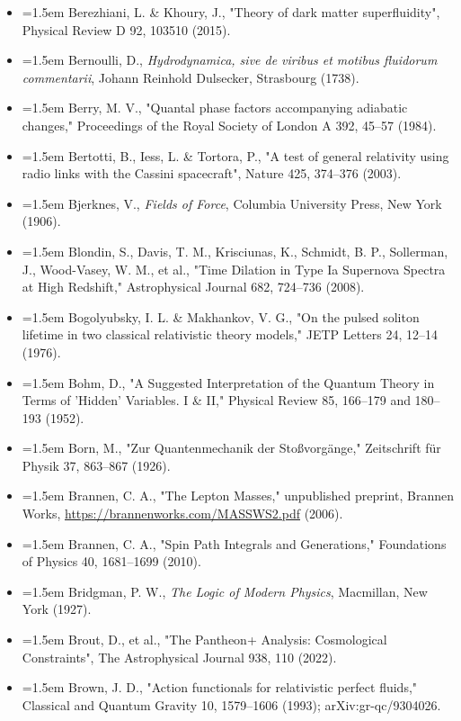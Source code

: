 \documentclass[11pt,a4paper]{article}
\begin{document}
\begin{itemize}[leftmargin=1.5em,label={}]
\item \hangindent=1.5em Berezhiani, L. \& Khoury, J., "Theory of dark matter superfluidity", Physical Review D 92, 103510 (2015).
\item \hangindent=1.5em Bernoulli, D., \emph{Hydrodynamica, sive de viribus et motibus fluidorum commentarii}, Johann Reinhold Dulsecker, Strasbourg (1738).
\item \hangindent=1.5em Berry, M. V., "Quantal phase factors accompanying adiabatic changes," Proceedings of the Royal Society of London A 392, 45–57 (1984).
\item \hangindent=1.5em Bertotti, B., Iess, L. \& Tortora, P., "A test of general relativity using radio links with the Cassini spacecraft", Nature 425, 374–376 (2003).
\item \hangindent=1.5em Bjerknes, V., \emph{Fields of Force}, Columbia University Press, New York (1906).
\item \hangindent=1.5em Blondin, S., Davis, T. M., Krisciunas, K., Schmidt, B. P., Sollerman, J., Wood-Vasey, W. M., et al., "Time Dilation in Type Ia Supernova Spectra at High Redshift," Astrophysical Journal 682, 724–736 (2008).
\item \hangindent=1.5em Bogolyubsky, I. L. \& Makhankov, V. G., "On the pulsed soliton lifetime in two classical relativistic theory models," JETP Letters 24, 12–14 (1976).
\item \hangindent=1.5em Bohm, D., "A Suggested Interpretation of the Quantum Theory in Terms of 'Hidden' Variables. I \& II," Physical Review 85, 166–179 and 180–193 (1952).
\item \hangindent=1.5em Born, M., "Zur Quantenmechanik der Stoßvorgänge," Zeitschrift für Physik 37, 863–867 (1926).
\item \hangindent=1.5em Brannen, C. A., "The Lepton Masses," unpublished preprint, Brannen Works, \href{https://brannenworks.com/MASSWS2.pdf}{https://brannenworks.com/MASSWS2.pdf} (2006).
\item \hangindent=1.5em Brannen, C. A., "Spin Path Integrals and Generations," Foundations of Physics 40, 1681–1699 (2010).
\item \hangindent=1.5em Bridgman, P. W., \emph{The Logic of Modern Physics}, Macmillan, New York (1927).
\item \hangindent=1.5em Brout, D., et al., "The Pantheon+ Analysis: Cosmological Constraints", The Astrophysical Journal 938, 110 (2022).
\item \hangindent=1.5em Brown, J. D., "Action functionals for relativistic perfect fluids," Classical and Quantum Gravity 10, 1579–1606 (1993); arXiv:gr-qc/9304026.

\end{itemize}
\end{document}
